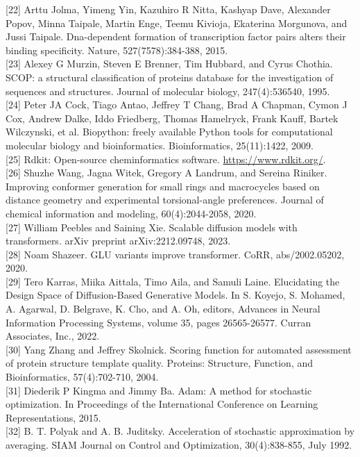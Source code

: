 \documentclass[10pt]{article}
\begin{document}
[22] Arttu Jolma, Yimeng Yin, Kazuhiro R Nitta, Kashyap Dave, Alexander Popov, Minna Taipale, Martin Enge, Teemu Kivioja, Ekaterina Morgunova, and Jussi Taipale. Dna-dependent formation of transcription factor pairs alters their binding specificity. Nature, 527(7578):384-388, 2015.\\[0pt]
[23] Alexey G Murzin, Steven E Brenner, Tim Hubbard, and Cyrus Chothia. SCOP: a structural classification of proteins database for the investigation of sequences and structures. Journal of molecular biology, 247(4):536540, 1995.\\[0pt]
[24] Peter JA Cock, Tiago Antao, Jeffrey T Chang, Brad A Chapman, Cymon J Cox, Andrew Dalke, Iddo Friedberg, Thomas Hamelryck, Frank Kauff, Bartek Wilczynski, et al. Biopython: freely available Python tools for computational molecular biology and bioinformatics. Bioinformatics, 25(11):1422, 2009.\\[0pt]
[25] Rdkit: Open-source cheminformatics software. \href{https://www.rdkit.org/}{https://www.rdkit.org/}.\\[0pt]
[26] Shuzhe Wang, Jagna Witek, Gregory A Landrum, and Sereina Riniker. Improving conformer generation for small rings and macrocycles based on distance geometry and experimental torsional-angle preferences. Journal of chemical information and modeling, 60(4):2044-2058, 2020.\\[0pt]
[27] William Peebles and Saining Xie. Scalable diffusion models with transformers. arXiv preprint arXiv:2212.09748, 2023.\\[0pt]
[28] Noam Shazeer. GLU variants improve transformer. CoRR, abs/2002.05202, 2020.\\[0pt]
[29] Tero Karras, Miika Aittala, Timo Aila, and Samuli Laine. Elucidating the Design Space of Diffusion-Based Generative Models. In S. Koyejo, S. Mohamed, A. Agarwal, D. Belgrave, K. Cho, and A. Oh, editors, Advances in Neural Information Processing Systems, volume 35, pages 26565-26577. Curran Associates, Inc., 2022.\\[0pt]
[30] Yang Zhang and Jeffrey Skolnick. Scoring function for automated assessment of protein structure template quality. Proteins: Structure, Function, and Bioinformatics, 57(4):702-710, 2004.\\[0pt]
[31] Diederik P Kingma and Jimmy Ba. Adam: A method for stochastic optimization. In Proceedings of the International Conference on Learning Representations, 2015.\\[0pt]
[32] B. T. Polyak and A. B. Juditsky. Acceleration of stochastic approximation by averaging. SIAM Journal on Control and Optimization, 30(4):838-855, July 1992.\\[0pt]
\end{document}
